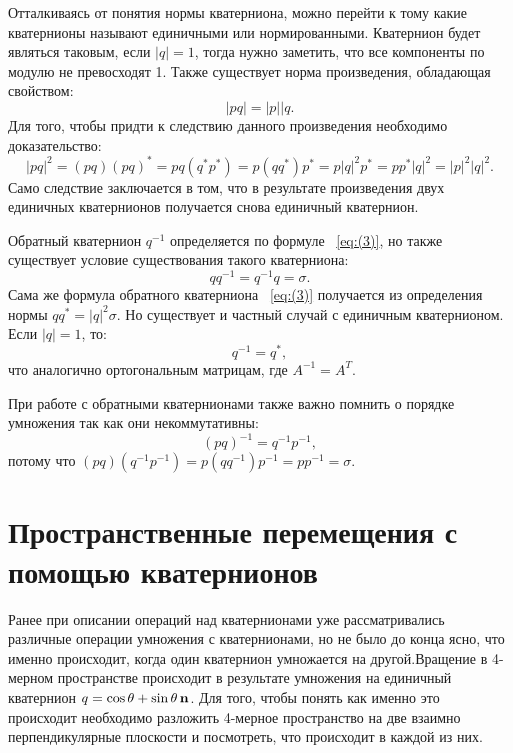Отталкиваясь от понятия нормы кватерниона, можно перейти к тому какие кватернионы называют единичными или нормированными. Кватернион будет являться таковым, если $|q| = 1$, тогда нужно заметить, что все компоненты по модулю не превосходят 1.
Также существует норма произведения, обладающая свойством:
\begin{equation*}
    |pq| = |p| |q.
\end{equation*}
Для того, чтобы придти к следствию данного произведения необходимо доказательство:
\begin{equation*}
    |pq|^2 = (pq)(pq)^* = pq (q^* p^*) = p (q q^*) p^* = p |q|^2 p^* = p p^* |q|^2 = |p|^2 |q|^2.
\end{equation*}
Само следствие заключается в том, что в результате произведения двух единичных кватернионов получается снова единичный кватернион.

Обратный кватернион $q^{-1}$ определяется по формуле ~\eqref{eq:(3)}, но также существует условие существования такого кватерниона:
\begin{equation*}
    q q^{-1} = q^{-1} q = \sigma.
\end{equation*}
Сама же формула обратного кватерниона ~\eqref{eq:(3)} получается из определения нормы $q q^* = |q|^2 \sigma$.
Но существует и частный случай с единичным кватернионом. Если $|q| = 1$, то:
\begin{equation*}
    q^{-1} = q^*,
\end{equation*}
что аналогично ортогональным матрицам, где $A^{-1} = A^T$.

При работе с обратными кватернионами также важно помнить о порядке умножения так как они некоммутативны:
\begin{equation*}
    (pq)^{-1} = q^{-1} p^{-1},
\end{equation*}
потому что $(pq)(q^{-1}p^{-1}) = p(q q^{-1})p^{-1} = p p^{-1} = \sigma$.

\section{Пространственные перемещения с помощью кватернионов}

Ранее при описании операций над кватернионами уже рассматривались различные операции умножения с кватернионами, но не было до конца ясно, что именно происходит, когда один кватернион умножается на другой.Вращение в 4-мерном пространстве происходит в результате умножения на единичный кватернион $q = \cos\theta + \sin\theta\,\vb{n}$.
Для того, чтобы понять как именно это происходит необходимо разложить 4-мерное пространство на две взаимно перпендикулярные плоскости и посмотреть, что происходит в каждой из них.

